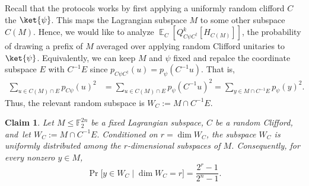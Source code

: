 \documentclass[11pt]{article}
\newtheorem{claim}[theorem]{Claim}
\newcommand{\E}{\mathop{\mathbb{E}}}
\begin{document}
Recall that the protocols works by first applying a uniformly random clifford $C$ the $\ket{\psi}$. This maps the Lagrangian subspace $M$ to some other subspace $C(M)$. Hence, we would like to analyze $\E_C[Q_{C\psi C^\dagger}^k[H_{C(M)}]]$, the probability of drawing a prefix of $M$ averaged over applying random Clifford unitaries to $\ket{\psi}$. Equivalently, we can keep $M$ and $\psi$ fixed and repalce the coordinate subspace $E$ with $C^{-1}E$ since $p_{C\psi C^\dagger}(u) = p_\psi(C^{-1}u)$. That is,
$$
\begin{aligned}
    \sum_{u\in C(M)\cap E} p_{C\psi}(u)^2
    &=
    \sum_{u\in C(M)\cap E} p_\psi(C^{-1}u)^2=
    \sum_{y\in M\cap C^{-1}E} p_\psi(y)^2 .
\end{aligned}
$$
Thus, the relevant random subspace is $W_C := M \cap C^{-1}E$.


\begin{claim}
\label{claim:random-intersection-symmetry}
Let $M\le \mathbb F_2^{2n}$ be a fixed Lagrangian subspace, $C$ be a random Clifford, and~let
$
    W_C:=M\cap C^{-1}E.
$
Conditioned on $r=\dim W_C$, the subspace $W_C$ is uniformly distributed
among the $r$-dimensional subspaces of $M$.  Consequently, for every
nonzero $y\in M$,
$$
    \Pr\big[y\in W_C\mid \dim W_C=r \big]
    =
    \frac{2^r-1}{2^n-1}.
$$
\end{claim}
\end{document}
